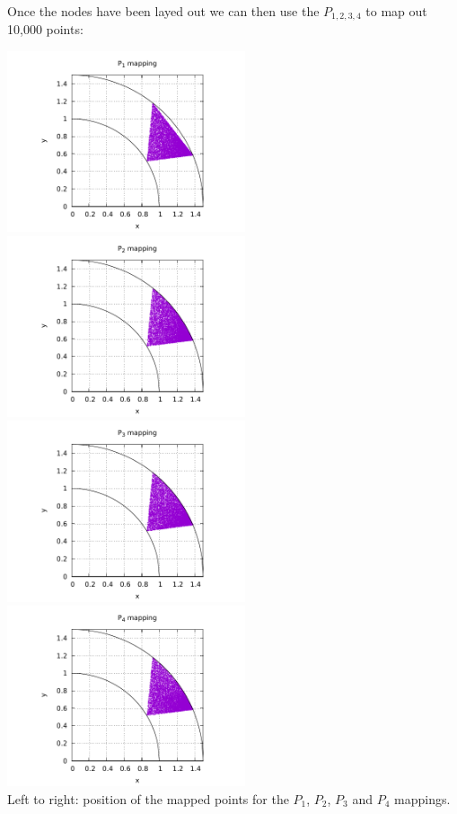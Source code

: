 Once the nodes have been layed out we can then use the $P_{1,2,3,4}$ to map
out 10,000 points:

\begin{center}
\includegraphics[width=7cm]{images/mappings/curved_triangles/xy1_volume.pdf}
\includegraphics[width=7cm]{images/mappings/curved_triangles/xy2_volume.pdf}\\
\includegraphics[width=7cm]{images/mappings/curved_triangles/xy3_volume.pdf}
\includegraphics[width=7cm]{images/mappings/curved_triangles/xy4_volume.pdf}\\
{\captionfont Left to right: position of the mapped points for the $P_1$, $P_2$, $P_3$ 
and $P_4$ mappings.}
\end{center}

